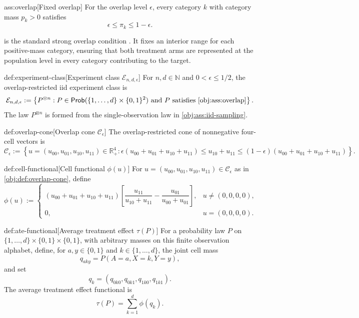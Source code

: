 \begin{assumptionv}{ass:overlap}[Fixed overlap]
For the overlap level \(\epsilon\), every category \(k\) with category mass \(p_k>0\) satisfies
\[
\epsilon \le \pi_k \le 1-\epsilon .
\]
\end{assumptionv}

 is the standard strong overlap condition \citep{ZengBalakrishnanHanKennedy2024}. It fixes an interior range for each positive-mass category, ensuring that both treatment arms are represented at the population level in every category contributing to the target.

\begin{definitionv}{def:experiment-class}[Experiment class \(\mathcal E_{n,d,\epsilon}\)]
For \(n,d\in\mathbb N\) and \(0<\epsilon\le 1/2\), the overlap-restricted iid experiment class is
\[
\mathcal E_{n,d,\epsilon}
:=
\left\{
P^{\otimes n}:
P\in\mathsf{Prob}(\{1,\ldots,d\}\times\{0,1\}^2)
\ \text{and } P \text{ satisfies } \cref{obj:ass:overlap}
\right\}.
\]
The law \(P^{\otimes n}\) is formed from the single-observation law in \cref{obj:ass:iid-sampling}.
\end{definitionv}

\begin{definitionv}{def:overlap-cone}[Overlap cone \(\mathcal C_\epsilon\)]
The overlap-restricted cone of nonnegative four-cell vectors is
\[
\mathcal C_\epsilon
:=
\left\{
u=(u_{00},u_{01},u_{10},u_{11})\in\mathbb R_+^4:
\epsilon(u_{00}+u_{01}+u_{10}+u_{11})
\le
u_{10}+u_{11}
\le
(1-\epsilon)(u_{00}+u_{01}+u_{10}+u_{11})
\right\}.
\]
\end{definitionv}

\begin{definitionv}{def:cell-functional}[Cell functional \(\phi(u)\)]
For \(u=(u_{00},u_{01},u_{10},u_{11})\in\mathcal C_\epsilon\) as in \cref{obj:def:overlap-cone}, define
\[
\phi(u)
:=
\begin{cases}
(u_{00}+u_{01}+u_{10}+u_{11})
\left[
\dfrac{u_{11}}{u_{10}+u_{11}}
-
\dfrac{u_{01}}{u_{00}+u_{01}}
\right],
& u\neq(0,0,0,0),\\[1.2em]
0,
& u=(0,0,0,0).
\end{cases}
\]
\end{definitionv}

\begin{definitionv}{def:ate-functional}[Average treatment effect \(\tau(P)\)]
For a probability law \(P\) on \(\{1,\ldots,d\}\times\{0,1\}\times\{0,1\}\), with arbitrary masses on this finite observation alphabet, define, for \(a,y\in\{0,1\}\) and \(k\in\{1,\ldots,d\}\), the joint cell mass
\[
q_{aky}=P(A=a,X=k,Y=y),
\]
and set
\[
q_k=(q_{0k0},q_{0k1},q_{1k0},q_{1k1}).
\]
The average treatment effect functional is
\[
\tau(P)
=
\sum_{k=1}^{d}\phi(q_k).
\]
\end{definitionv}

